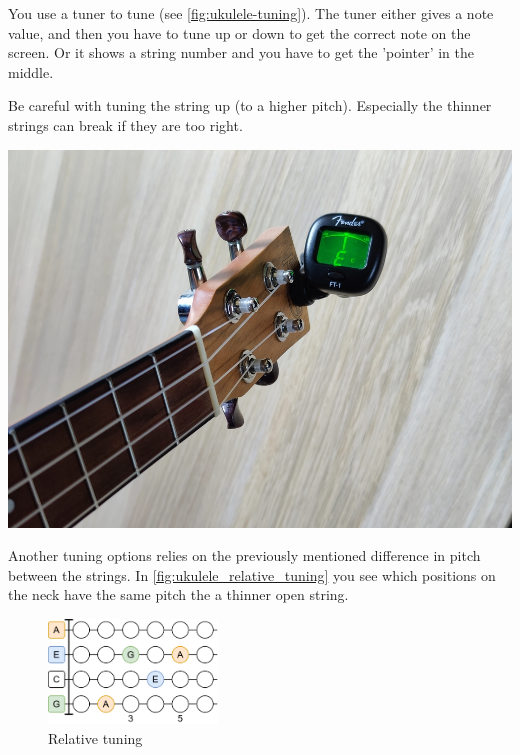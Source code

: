 \begin{minipage}{0.5\textwidth}
You use a tuner to tune (see \autoref{fig:ukulele-tuning}). The tuner either gives a note value, and then you have to tune up or down to get the correct note on the screen. Or it shows a string number and you have to get the 'pointer' in the middle.

Be careful with tuning the string up (to a higher pitch). Especially the thinner strings can break if they are too right.
\end{minipage}
\hfill
\begin{minipage}{0.35\textwidth}
	\centering
	\includegraphics[width=\textwidth]{../../Images/ukulele-tuning.jpg}
	\label{fig:ukulele-tuning}
\end{minipage}

Another tuning options relies on the previously mentioned difference in pitch between the strings. In \autoref{fig:ukulele_relative_tuning} you see which positions on the neck have the same pitch the a thinner open string.

\begin{figure}[h]
	\centering
	\includegraphics[width=0.4\textwidth]{../../Images/UkuleleRelativeTuning.png}
	\caption{Relative tuning}
	\label{fig:ukulele_relative_tuning}
\end{figure}
